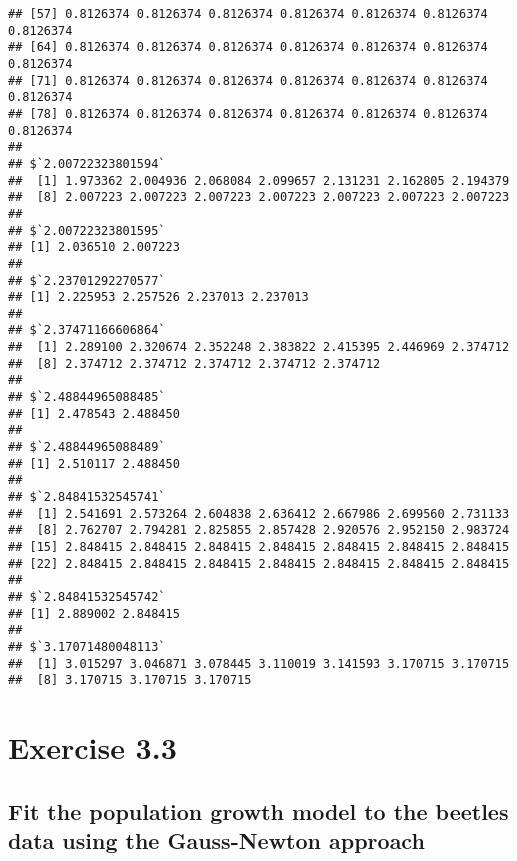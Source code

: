 \documentclass[]{book}
\theoremstyle{definition}
\theoremstyle{definition}
\theoremstyle{definition}
\theoremstyle{remark}
\begin{document}
\begin{verbatim}
## [57] 0.8126374 0.8126374 0.8126374 0.8126374 0.8126374 0.8126374 0.8126374
## [64] 0.8126374 0.8126374 0.8126374 0.8126374 0.8126374 0.8126374 0.8126374
## [71] 0.8126374 0.8126374 0.8126374 0.8126374 0.8126374 0.8126374 0.8126374
## [78] 0.8126374 0.8126374 0.8126374 0.8126374 0.8126374 0.8126374 0.8126374
## 
## $`2.00722323801594`
##  [1] 1.973362 2.004936 2.068084 2.099657 2.131231 2.162805 2.194379
##  [8] 2.007223 2.007223 2.007223 2.007223 2.007223 2.007223 2.007223
## 
## $`2.00722323801595`
## [1] 2.036510 2.007223
## 
## $`2.23701292270577`
## [1] 2.225953 2.257526 2.237013 2.237013
## 
## $`2.37471166606864`
##  [1] 2.289100 2.320674 2.352248 2.383822 2.415395 2.446969 2.374712
##  [8] 2.374712 2.374712 2.374712 2.374712 2.374712
## 
## $`2.48844965088485`
## [1] 2.478543 2.488450
## 
## $`2.48844965088489`
## [1] 2.510117 2.488450
## 
## $`2.84841532545741`
##  [1] 2.541691 2.573264 2.604838 2.636412 2.667986 2.699560 2.731133
##  [8] 2.762707 2.794281 2.825855 2.857428 2.920576 2.952150 2.983724
## [15] 2.848415 2.848415 2.848415 2.848415 2.848415 2.848415 2.848415
## [22] 2.848415 2.848415 2.848415 2.848415 2.848415 2.848415 2.848415
## 
## $`2.84841532545742`
## [1] 2.889002 2.848415
## 
## $`3.17071480048113`
##  [1] 3.015297 3.046871 3.078445 3.110019 3.141593 3.170715 3.170715
##  [8] 3.170715 3.170715 3.170715
\end{verbatim}

\chapter{Exercise 3.3}\label{exercise-3.3}

\section{Fit the population growth model to the beetles data using the
Gauss-Newton
approach}\label{fit-the-population-growth-model-to-the-beetles-data-using-the-gauss-newton-approach}
\end{document}

